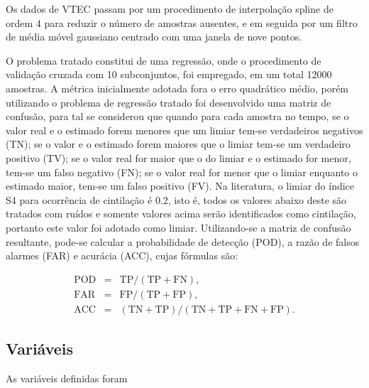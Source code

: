 Os dados de VTEC passam por um procedimento de interpolação  spline de ordem 4 para reduzir o número de amostras ausentes, e em seguida por um filtro de média móvel gaussiano centrado com uma janela de nove pontos.

O problema tratado constitui de uma regressão, onde o procedimento de validação cruzada com 10 subconjuntos, foi empregado, em um total 12000 amostras. A métrica inicialmente adotada fora o erro quadrático médio, porém utilizando o problema de regressão tratado foi desenvolvido uma matriz de confusão, para tal se considerou que quando para cada amostra no tempo, se o valor real e o estimado forem menores que um limiar tem-se verdadeiros negativos (TN); se o valor e o estimado forem maiores que o limiar tem-se um verdadeiro positivo (TV); se o valor real for maior que o do limiar e o estimado for menor, tem-se um falso negativo (FN); se o valor real for menor que o limiar enquanto o estimado maior, tem-se um falso positivo (FV). Na literatura, o limiar do índice S4 para ocorrência de cintilação é 0.2, isto é, todos os valores abaixo deste são tratados com ruídos e somente valores acima serão identificados como cintilação, portanto este valor foi adotado como limiar. Utilizando-se a matriz de confusão resultante, pode-se calcular a probabilidade de detecção (POD), a razão de falsos alarmes (FAR) e acurácia (ACC), cujas fórmulas são:

\begin{eqnarray}
\mbox{POD}&=&\mbox{TP}/(\mbox{TP}+\mbox{FN})\mbox{,}\\
\mbox{FAR}&=&\mbox{FP}/(\mbox{TP}+\mbox{FP})\mbox{,}\\ 
\mbox{ACC}&=&(\mbox{TN}+\mbox{TP})/(\mbox{TN}+\mbox{TP}+\mbox{FN}+\mbox{FP})\mbox{.}
\end{eqnarray}

\subsection{Variáveis}

As variáveis definidas foram

